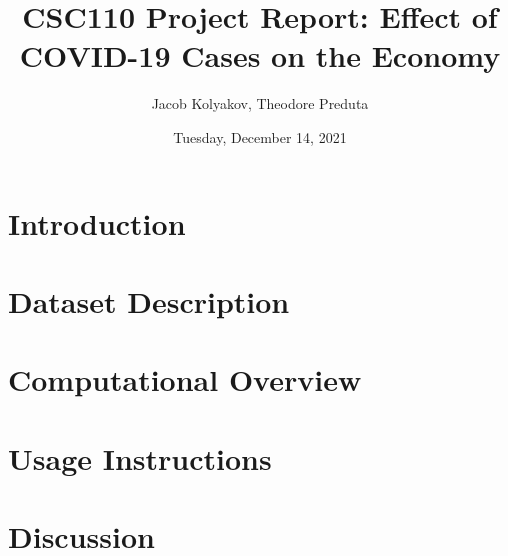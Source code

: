 \documentclass[fontsize=11pt]{article}
\title{CSC110 Project Report: Effect of COVID-19 Cases on the Economy} %
\author{Jacob Kolyakov, Theodore Preduta}
\date{Tuesday, December 14, 2021}
\begin{document}
\maketitle

\section*{Introduction}


\section*{Dataset Description}


\section*{Computational Overview}


\section*{Usage Instructions}


\section*{Discussion}


\raggedright %
\printbibliography

\end{document}
